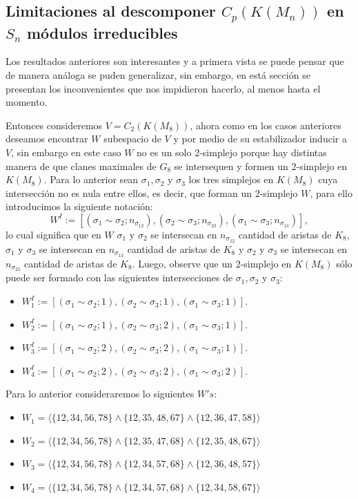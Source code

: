\documentclass[12pt]{book}
\theoremstyle{definition}
\newcounter{in}
\begin{document}
\subsection{Limitaciones al descomponer $C_{p}(K(M_n))$ en $S_{n}$ módulos irreducibles}
\label{Lim}
Los resultados anteriores son interesantes y a primera vista se puede pensar que de manera análoga se puden generalizar, sin embargo, en está sección se presentan los inconvenientes que nos impidieron hacerlo, al menos hasta el momento.


Entonces consideremos $V = C_{2}(K(M_{8}))$, ahora como en los casos anteriores deseamos encontrar $W$ subespacio de $V$ y por medio de su estabilizador inducir a $V$, sin embargo en este caso $W$ no es un solo $2$-simplejo porque hay distintas manera de que clanes maximales de $G_{8}$ se intersequen y formen un $2$-simplejo en $K(M_{8})$. Para lo anterior sean $\sigma_{1}, \sigma_{2}$ y $\sigma_{3}$ los tres simplejos en $K(M_{8})$ cuya intersección no es nula entre ellos, es decir, que forman un $2$-simplejo $W$, para ello introducimos la siguiente notación:
$$W^{I} := \left [ (\sigma_{1} \sim  \sigma_{2}; n_{\sigma_{12}}), (\sigma_{2} \sim \sigma_{3}; n_{\sigma_{23}}), (\sigma_{1} \sim \sigma_{3}; n_{\sigma_{13}})\right ],$$
lo cual significa que en $W$ $\sigma_{1}$ y $\sigma_{2}$ se intersecan en $n_{\sigma_{12}}$ cantidad de aristas de $K_{8}$, $\sigma_{1}$ y $\sigma_{3}$ se intersecan en $n_{\sigma_{13}}$ cantidad de aristas de $K_{8}$ y $\sigma_{2}$ y $\sigma_{3}$ se intersecan en $n_{\sigma_{23}}$ cantidad de aristas de $K_{8}$.
Luego, observe que un $2$-simplejo en $K(M_{8})$ sólo puede ser formado con las siguientes intersecciones de $\sigma_{1}, \sigma_{2}$ y $\sigma_{3}$:
\begin{itemize}
\item $W_{1}^{I} := \left [ (\sigma_{1} \sim  \sigma_{2}; 1), (\sigma_{2} \sim \sigma_{3}; 1), (\sigma_{1} \sim \sigma_{3}; 1)\right ].$
\item $W_{2}^{I} := \left [ (\sigma_{1} \sim  \sigma_{2}; 1), (\sigma_{2} \sim \sigma_{3}; 2), (\sigma_{1} \sim \sigma_{3}; 1)\right ].$
\item $W_{3}^{I} := \left [ (\sigma_{1} \sim  \sigma_{2}; 2), (\sigma_{2} \sim \sigma_{3}; 2), (\sigma_{1} \sim \sigma_{3}; 1)\right ].$
\item $W_{4}^{I} := \left [ (\sigma_{1} \sim  \sigma_{2}; 2), (\sigma_{2} \sim \sigma_{3}; 2), (\sigma_{1} \sim \sigma_{3}; 2)\right ].$
\end{itemize}
Para lo anterior consideraremos lo siguientes $W's$:
\begin{itemize}
\item $W_{1} = \langle \{12,34,56,78\} \wedge \{12,35,48,67\} \wedge \{12,36,47,58\} \rangle$
\item $W_{2} = \langle \{12,34,56,78\} \wedge \{12,35,47,68\} \wedge \{12,35,48,67\} \rangle$
\item $W_{3} = \langle \{12,34,56,78\} \wedge \{12,34,57,68\} \wedge \{12,36,48,57\} \rangle$
\item $W_{4} = \langle \{12,34,56,78\} \wedge \{12,34,57,68\} \wedge \{12,34,58,67\} \rangle$
\end{itemize}
\end{document}
